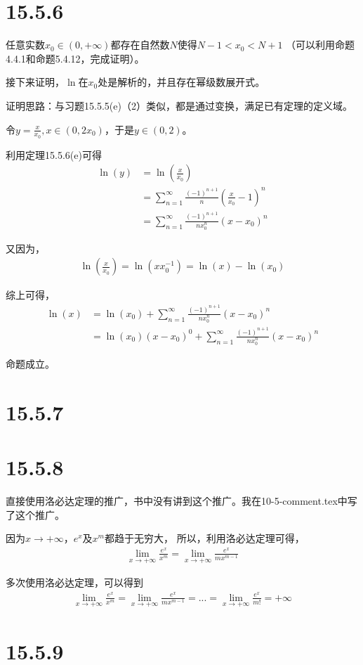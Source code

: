 \documentclass{article}
\begin{document}
\section*{15.5.6}

任意实数$x_0 \in (0, + \infty)$都存在自然数$N$使得$N - 1 < x_0 < N + 1$
（可以利用命题4.4.1和命题5.4.12，完成证明）。

接下来证明，$\ln$在$x_0$处是解析的，并且存在幂级数展开式。

证明思路：与习题15.5.5(e)（2）类似，都是通过变换，满足已有定理的定义域。

令$y = \frac{x}{x_0}, x \in (0, 2x_0)$，于是$y \in (0, 2)$。

利用定理15.5.6(e)可得
\begin{align*}
  \ln(y) & = \ln(\frac{x}{x_0})                                                       \\
         & = \sum \limits_{n = 1}^\infty \frac{(-1)^{n + 1}}{n} (\frac{x}{x_0} - 1)^n \\
         & = \sum \limits_{n = 1}^\infty \frac{(-1)^{n + 1}}{nx_0^n} (x - x_0)^n
\end{align*}

又因为，
\begin{align*}
  \ln(\frac{x}{x_0}) = \ln(xx_0^{-1}) = \ln(x) - \ln(x_0)
\end{align*}

综上可得，
\begin{align*}
  \ln(x) & = \ln(x_0) + \sum \limits_{n = 1}^\infty \frac{(-1)^{n + 1}}{nx_0^n} (x - x_0)^n            \\
         & = \ln(x_0)(x - x_0)^0 + \sum \limits_{n = 1}^\infty \frac{(-1)^{n + 1}}{nx_0^n} (x - x_0)^n
\end{align*}

命题成立。

\section*{15.5.7}



\section*{15.5.8}

直接使用洛必达定理的推广，书中没有讲到这个推广。我在10-5-comment.tex中写了这个推广。

因为$x \to +\infty$，$e^x$及$x^m$都趋于无穷大，
所以，利用洛必达定理可得，
\begin{align*}
  \lim\limits_{x \to +\infty} \frac{e^x}{x^m} 
  = 
  \lim\limits_{x \to +\infty} \frac{e^x}{mx^{m - 1}} 
\end{align*}

多次使用洛必达定理，可以得到
\begin{align*}
  \lim\limits_{x \to +\infty} \frac{e^x}{x^m} 
  = 
  \lim\limits_{x \to +\infty} \frac{e^x}{mx^{m - 1}} 
  = 
  ...
  =
  \lim\limits_{x \to +\infty} \frac{e^x}{m!}
  = +\infty
\end{align*}

\section*{15.5.9}
\end{document}
